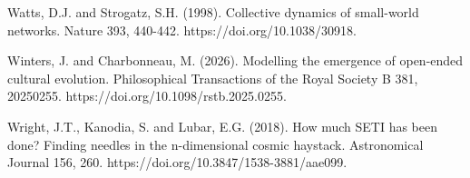 \documentclass[
  10pt,a4paper,
]{article}
\begin{document}
Watts, D.J. and Strogatz, S.H. (1998). Collective dynamics of
small-world networks. Nature 393, 440-442.
https://doi.org/10.1038/30918.

Winters, J. and Charbonneau, M. (2026). Modelling the emergence of
open-ended cultural evolution. Philosophical Transactions of the Royal
Society B 381, 20250255. https://doi.org/10.1098/rstb.2025.0255.

Wright, J.T., Kanodia, S. and Lubar, E.G. (2018). How much SETI has been
done? Finding needles in the n-dimensional cosmic haystack. Astronomical
Journal 156, 260. https://doi.org/10.3847/1538-3881/aae099.
\end{document}

